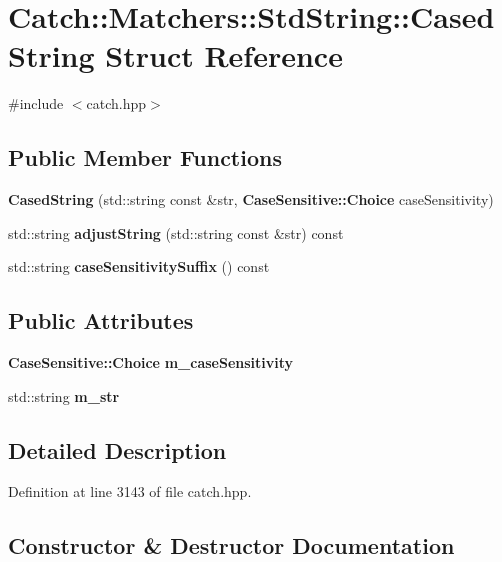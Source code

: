 \section{Catch\+::Matchers\+::Std\+String\+::Cased\+String Struct Reference}
\label{struct_catch_1_1_matchers_1_1_std_string_1_1_cased_string}


{\ttfamily \#include $<$catch.\+hpp$>$}

\subsection*{Public Member Functions}
\begin{DoxyCompactItemize}
\item 
\textbf{ Cased\+String} (std\+::string const \&str, \textbf{ Case\+Sensitive\+::\+Choice} case\+Sensitivity)
\item 
std\+::string \textbf{ adjust\+String} (std\+::string const \&str) const
\item 
std\+::string \textbf{ case\+Sensitivity\+Suffix} () const
\end{DoxyCompactItemize}
\subsection*{Public Attributes}
\begin{DoxyCompactItemize}
\item 
\textbf{ Case\+Sensitive\+::\+Choice} \textbf{ m\+\_\+case\+Sensitivity}
\item 
std\+::string \textbf{ m\+\_\+str}
\end{DoxyCompactItemize}


\subsection{Detailed Description}


Definition at line 3143 of file catch.\+hpp.



\subsection{Constructor \& Destructor Documentation}
\mbox{\label{struct_catch_1_1_matchers_1_1_std_string_1_1_cased_string_aa88bbc5acd2bff22351d8d4b1816b561}} 
